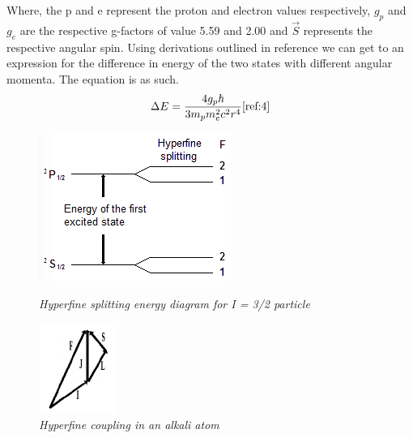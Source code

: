 \documentclass[twocolumn]{article}
\begin{document}
Where, the p and e represent the proton and electron values respectively, $g_p$ and $g_e$ are the respective g-factors of value 5.59 and 2.00 and $\vec{S}$ 
represents the respective angular spin. Using derivations outlined in reference 
\cite{ref:4} we can get to an expression for the difference in energy of the 
two states with different angular momenta. The equation is as such.
\begin{equation}
\Delta E = \frac{4g_p\hbar}{3m_pm_e^2c^2r^4}
\label{eqn:3}
\cite{ref:4}
\end{equation}
\begin{figure}
\begin{minipage}[t]{0.46\linewidth}
\includegraphics[width=\linewidth]{pictures/hyperfine-splitting.png}
\caption{\textit{Hyperfine splitting energy diagram for I = 3/2 particle 
\cite{ref:3}}}
\label{fig:3}
\end{minipage}
\begin{minipage}[t]{0.46\linewidth}
\includegraphics[width=0.3\linewidth]{pictures/hyperfine-vectors.png}
\caption{\textit{Hyperfine coupling in an alkali atom \cite{ref:3}}}
\label{fig:4}
\end{minipage}
\end{figure}
\end{document}
